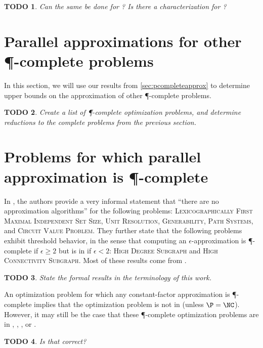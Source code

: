 \documentclass[]{article}
\theoremstyle{plain}
\newtheorem{todo}{TODO}
\theoremstyle{definition}
\begin{document}
\begin{todo}
  Can the same be done for \NNC?
  Is there a \PCP{} characterization for \NNC?
\end{todo}

\section{Parallel approximations for other \texorpdfstring{\P}{P}-complete problems}

In this section, we will use our results from \autoref{sec:pcompleteapprox} to determine upper bounds on the approximation of other \P-complete problems.

\begin{todo}
  Create a list of \P-complete optimization problems, and determine reductions to the complete problems from the previous section.
\end{todo}

\section{Problems for which parallel approximation is \texorpdfstring{\P}{P}-complete}
\label{sec:approximationispcomplete}

In \cite[Section~10.2]{ghr95}, the authors provide a very informal statement that ``there are no \NC{} approximation algorithms'' for the following problems: \textsc{Lexicographically First Maximal Independent Set Size}, \textsc{Unit Resolution}, \textsc{Generability}, \textsc{Path Systems}, and \textsc{Circuit Value Problem}.
They further state that the following problems exhibit threshold behavior, in the sense that computing an $\epsilon$-approximation is \P-complete if $\epsilon\geq 2$ but is in \NCAS{} if $\epsilon<2$: \textsc{High Degree Subgraph} and \textsc{High Connectivity Subgraph}.
Most of these results come from \cite{ss89}.

\begin{todo}
  State the formal results in the terminology of this work.
\end{todo}

An optimization problem for which any constant-factor approximation is \P-complete implies that the optimization problem is not in \ApxNCO{} (unless $\P=\NC$).
However, it may still be the case that these \P-complete optimization problems are in \logApxNCO, \polyApxNCO, \expApxNCO, or \NNCO.

\begin{todo}
  Is that correct?
\end{todo}
\end{document}
